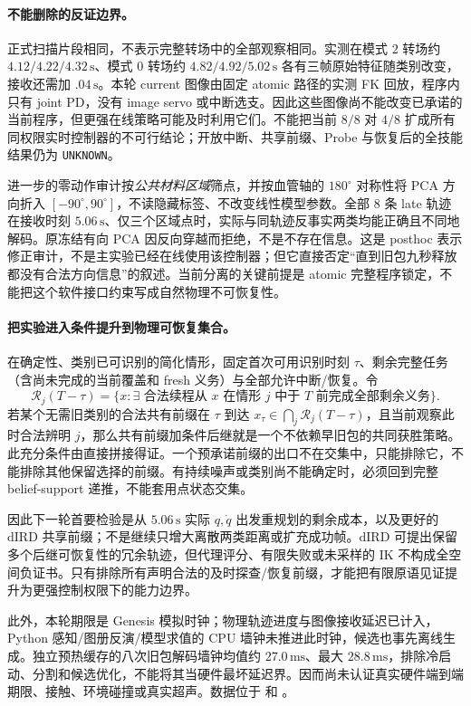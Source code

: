 \documentclass[11pt,a4paper,fontset=fandol]{ctexart}
\theoremstyle{definition}
\theoremstyle{remark}\newtheorem{remark}[theorem]{说明}
\numberwithin{equation}{section}
\begin{document}
\paragraph{不能删除的反证边界。}
正式扫描片段相同，不表示完整转场中的全部观察相同。实测在模式 $2$ 转场约 $4.12/4.22/4.32\,\mathrm{s}$、模式 $0$ 转场约 $4.82/4.92/5.02\,\mathrm{s}$ 各有三帧原始特征随类别改变，接收还需加 $.04\,\mathrm{s}$。本轮 current 图像由固定 atomic 路径的实测 FK 回放，程序内只有 joint PD，没有 image servo 或中断选支。因此这些图像尚不能改变已承诺的当前程序，但更强在线策略可能及时利用它们。不能把当前 $8/8$ 对 $4/8$ 扩成所有同权限实时控制器的不可行结论；开放中断、共享前缀、Probe 与恢复后的全技能结果仍为 \texttt{UNKNOWN}。


进一步的零动作审计按\emph{公共材料区域}筛点，并按血管轴的 $180^\circ$ 对称性将 PCA 方向折入 $[-90^\circ,90^\circ]$，不读隐藏标签、不改变线性模型参数。全部 $8$ 条 late 轨迹在接收时刻 $5.06\,\mathrm{s}$、仅三个区域点时，实际与同轨迹反事实两类均能正确且不同地解码。原冻结有向 PCA 因反向穿越而拒绝，不是不存在信息。这是 posthoc 表示修正审计，不是主实验已经在线使用该控制器；但它直接否定“直到旧包九秒释放都没有合法方向信息”的叙述。当前分离的关键前提是 atomic 完整程序锁定，不能把这个软件接口约束写成自然物理不可恢复性。

\paragraph{把实验进入条件提升到物理可恢复集合。}
在确定性、类别已可识别的简化情形，固定首次可用识别时刻 $\tau$、剩余完整任务（含尚未完成的当前覆盖和 fresh 义务）与全部允许中断/恢复。令
\[
 \mathcal R_j(T-\tau)=\{x:\exists\text{ 合法续程从 }x\text{ 在情形 }j\text{ 中于 }T\text{ 前完成全部剩余义务}\}.
\]
若某个无需旧类别的合法共有前缀在 $\tau$ 到达 $x_\tau\in\bigcap_j\mathcal R_j(T-\tau)$，且当前观察此时合法辨明 $j$，那么共有前缀加条件后继就是一个不依赖早旧包的共同获胜策略。此充分条件由直接拼接得证。一个预承诺前缀的出口不在交集中，只能排除它，不能排除其他保留选择的前缀。有持续噪声或类别尚不能确定时，必须回到完整 belief-support 递推，不能套用点状态交集。

因此下一轮首要检验是从 $5.06\,\mathrm{s}$ 实际 $q,\dot q$ 出发重规划的剩余成本，以及更好的 dIRD 共享前缀；不是继续只增大离散两类距离或扩充成功帧。dIRD 可提出保留多个后继可恢复性的冗余轨迹，但代理评分、有限失败或未采样的 IK 不构成全空间负证书。只有排除所有声明合法的及时探查/恢复前缀，才能把有限原语见证提升为更强控制权限下的能力边界。

此外，本轮期限是 Genesis 模拟时钟；物理轨迹进度与图像接收延迟已计入，Python 感知/图册反演/模型求值的 CPU 墙钟未推进此时钟，候选也事先离线生成。独立预热缓存的八次旧包解码墙钟均值约 $27.0\,\mathrm{ms}$、最大 $28.8\,\mathrm{ms}$，排除冷启动、分割和候选优化，不能将其当硬件最坏延迟界。因而尚未认证真实硬件端到端期限、接触、环境碰撞或真实超声。数据位于  和 。
\end{document}
